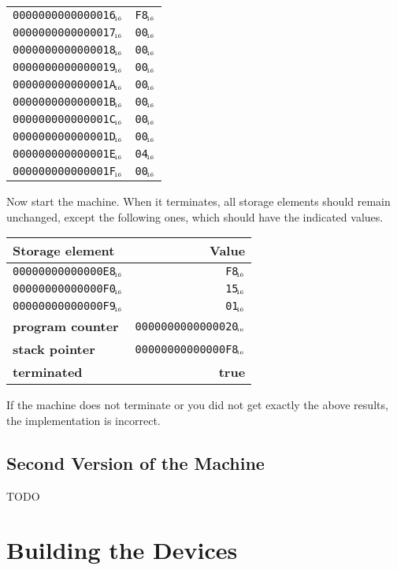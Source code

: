 \documentclass[a4paper,11pt]{article}
\newcommand{\PC}{\textbf{program counter}\xspace}
\newcommand{\SP}{\textbf{stack pointer}\xspace}
\newcommand{\TERM}{\textbf{terminated}\xspace}
\newcommand{\T}{\textbf{true}\xspace}
\newcommand{\num}[1]{\texttt{#1}\xspace}
\newcommand{\hex}[1]{\num{#1}$_{\textup{\tiny\hskip-1ex 16}}$\xspace}
\begin{document}
\begin{center}
\begin{tabular}{@{}ll@{}}
    \hex{0000000000000016} & \hex{F8} \\
    \hex{0000000000000017} & \hex{00} \\
    \hex{0000000000000018} & \hex{00} \\
    \hex{0000000000000019} & \hex{00} \\
    \hex{000000000000001A} & \hex{00} \\
    \hex{000000000000001B} & \hex{00} \\
    \hex{000000000000001C} & \hex{00} \\
    \hex{000000000000001D} & \hex{00} \\
    \hex{000000000000001E} & \hex{04} \\
    \hex{000000000000001F} & \hex{00} \\
    \hline
  \end{tabular}
\end{center}

Now start the machine.
When it terminates, all storage elements should remain unchanged, except the following ones, which should have the indicated values.

\begin{center}
  \begin{tabular}{@{}lr@{}}
    \hline
    Storage element        & Value                   \\
    \hline
    \hex{00000000000000E8} & \hex{F8} \\
    \hex{00000000000000F0} & \hex{15} \\
    \hex{00000000000000F9} & \hex{01} \\
    \PC                    & \hex{0000000000000020}  \\
    \SP                    & \hex{00000000000000F8}  \\
    \TERM                  & \T                      \\
    \hline
  \end{tabular}
\end{center}

If the machine does not terminate or you did not get exactly the above results, the implementation is incorrect.

\subsection{Second Version of the Machine}

TODO

\section{Building the Devices}
\label{sec:building-devices}
\end{document}
